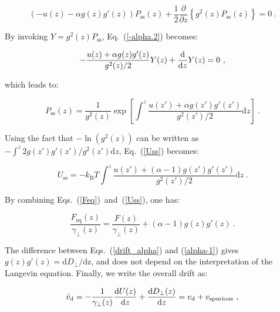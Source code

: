 \begin{equation}
	\left(-u(z) - \alpha g(z)g'(z)\right)P_\mathrm{ss}(z) + \frac{1}{2}\frac{\partial}{\partial z} \left\{ g^2(z) P_\mathrm{ss}(z) \right\} =0~.
	\label{-alpha.2}
\end{equation}

By invoking $Y=g^2(z)P_\mathrm{ss}$, Eq.~(\ref{-alpha.2}) becomes:

\begin{equation}
	-\frac{u(z) + \alpha g(z)g'(z)}{g^2(z) / 2} Y(z) + \frac{\textnormal{d} }{\textnormal{d} z} Y(z)=0~,
\end{equation}

which leads to:

\begin{equation}
	P_\mathrm{ss}(z) = \frac{1}{g^2(z)} \exp \left[ \int^{z} \frac{u(z') + \alpha g(z')g'(z')}{g^2(z') / 2} \mathrm{d}z \right] ~.
	\label{-alpha.3}
\end{equation}

Using the fact that $-\ln(g^2(z))$ can be written as $-\int^{z} 2 g(z')g'(z') / g^2(z') \mathrm{d}z$, Eq.~(\ref{Uss}) becomes:

\begin{equation}
	U_\mathrm{ss} = -k_\mathrm{B}T \int^{z} \frac{u(z') + (\alpha - 1) g(z')g'(z')}{g^2(z') / 2} \mathrm{d}z~.
\end{equation}



By combining Eqs.~(\ref{Feq})~and~(\ref{Uss}), one has:

\begin{equation}
	\frac{F_\mathrm{eq}(z)}{\gamma_\bot(z)} = \frac{F(z)}{\gamma_\bot(z)} + (\alpha - 1)g(z)g'(z)~.
	\label{alpha-1}
\end{equation}

The difference between Eqs.~(\ref{drift_alpha}) and (\ref{alpha-1}) gives $g(z)g'(z) = \mathrm{d}D_\bot/ \mathrm{dz}$, and does not depend on the interpretation of the Langevin equation. Finally, we write the overall drift as:

\begin{equation}
	\bar{v}_\mathrm{d} = -\frac{1}{\gamma_\bot(z)} \frac{\textnormal{d} U(z)}{\textnormal{d} z} + \frac{\mathrm{d} D_\bot(z)}{\mathrm{d}z}  = v_\mathrm{d} + v_\mathrm{spurious}~,
	\label{Eq.total_drifts}
\end{equation}

